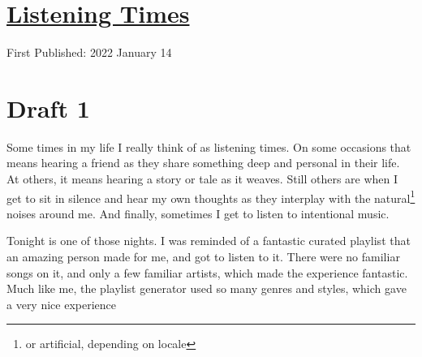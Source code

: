 \documentclass[12pt]{article}[titlepage]
\newcommand{\1}{\={a}}
\newcommand{\2}{\={e}}
\newcommand{\3}{\={\i}}
\newcommand{\4}{\=o}
\newcommand{\5}{\=u}
\newcommand{\6}{\={A}}
\renewcommand{\,}{\textsuperscript{,}}
\begin{document}
\doublespacing
\section{\href{listening-times.html}{Listening Times}}
First Published: 2022 January 14

\section{Draft 1}
Some times in my life I really think of as listening times.
On some occasions that means hearing a friend as they share something deep and personal in their life.
At others, it means hearing a story or tale as it weaves.
Still others are when I get to sit in silence and hear my own thoughts as they interplay with the natural\footnote{or artificial, depending on locale} noises around me.
And finally, sometimes I get to listen to intentional music.

Tonight is one of those nights.
I was reminded of a fantastic curated playlist that an amazing person made for me, and got to listen to it.
There were no familiar songs on it, and only a few familiar artists, which made the experience fantastic.
Much like me, the playlist generator used so many genres and styles, which gave a very nice experience
\end{document}
